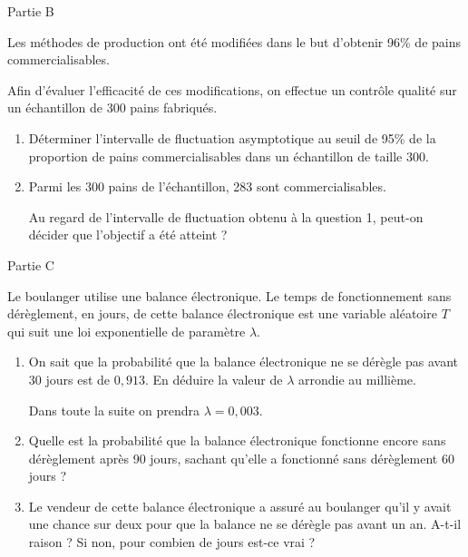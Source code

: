 \begin{h3}Partie B\end{h3}
Les méthodes de production ont été modifiées dans le but d'obtenir 96\% de pains commercialisables.
\par
Afin d'évaluer l'efficacité de ces modifications, on effectue un contrôle qualité sur un échantillon de 300 pains fabriqués.
\begin{enumerate}
     \item
     Déterminer l'intervalle de fluctuation asymptotique au seuil de 95\% de la proportion de pains commercialisables dans un échantillon de taille 300.
     \item
     Parmi les 300 pains de l'échantillon, 283 sont commercialisables.
     \par
     Au regard de l'intervalle de fluctuation obtenu à la question 1, peut-on décider que l'objectif a été atteint ?
\end{enumerate}
\begin{h3}Partie C\end{h3}
Le boulanger utilise une balance électronique. Le temps de fonctionnement sans dérèglement, en jours, de cette balance électronique est une variable aléatoire $T$ qui suit une loi exponentielle de paramètre $\lambda $.
\begin{enumerate}
     \item
     On sait que la probabilité que la balance électronique ne se dérègle pas avant 30 jours est de $0,913$. En déduire la valeur de $\lambda $ arrondie au millième.
     \par
     Dans toute la suite on prendra $\lambda =0,003$.
     \item
     Quelle est la probabilité que la balance électronique fonctionne encore sans dérèglement après 90 jours, sachant qu'elle a fonctionné sans dérèglement 60 jours ?
     \item
     Le vendeur de cette balance électronique a assuré au boulanger qu'il y avait une chance sur deux pour que la balance ne se dérègle pas avant un an. A-t-il raison ? Si non, pour combien de jours est-ce vrai ?
\end{enumerate}
